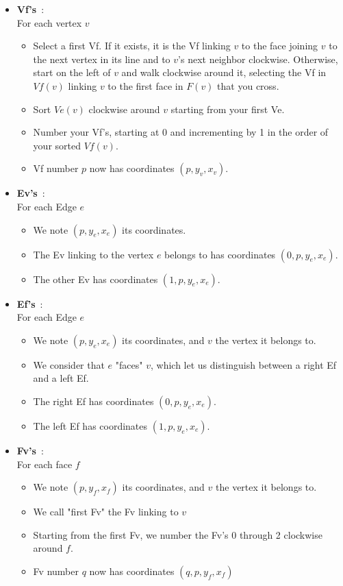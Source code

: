 \documentclass{article}
\begin{document}
\begin{itemize}
	\item \textbf{Vf's}~:\\
	For each vertex $v$
	\begin{itemize}[noitemsep, nosep, label=-]
		\item Select a first Vf. If it exists, it is the Vf linking $v$ to the face joining $v$ to the next vertex in its line and to $v$'s next neighbor clockwise. Otherwise, start on the left of $v$ and walk clockwise around it, selecting the Vf in $Vf(v)$ linking $v$ to the first face in $F(v)$ that you cross.
		\item Sort $Ve(v)$ clockwise around $v$ starting from your first Ve.
		\item Number your Vf's, starting at 0 and incrementing by 1 in the order of your sorted $Vf(v)$.
		\item Vf number $p$ now has coordinates $(p, y_v, x_v)$.
	\end{itemize}
	
	\item \textbf{Ev's}~:\\
	For each Edge $e$ 
	\begin{itemize}[noitemsep, nosep, label=-]
		\item We note $(p, y_e, x_e)$ its coordinates.
		\item The Ev linking to the vertex $e$ belongs to has coordinates $(0, p, y_e, x_e)$.
		\item The other Ev has coordinates $(1, p, y_e, x_e)$.
	\end{itemize}
	
	\item \textbf{Ef's}~:\\
	For each Edge $e$ 
	\begin{itemize}[noitemsep, nosep, label=-]
		\item We note $(p, y_e, x_e)$ its coordinates, and $v$ the vertex it belongs to.
		\item We consider that $e$ "faces" $v$, which let us distinguish between a right Ef and a left Ef.
		\item The right Ef has coordinates $(0, p, y_e, x_e)$.
		\item The left Ef has coordinates $(1, p, y_e, x_e)$.
	\end{itemize}
	
	\item \textbf{Fv's}~:\\
	For each face $f$ 
	\begin{itemize}[noitemsep, nosep, label=-]
		\item We note $(p, y_f, x_f)$ its coordinates, and $v$ the vertex it belongs to.
		\item We call "first Fv" the Fv linking to $v$
		\item Starting from the first Fv, we number the Fv's 0 through 2 clockwise around $f$.
		\item Fv number $q$ now has coordinates $(q, p, y_f, x_f)$
	\end{itemize}
	

\end{itemize}
\end{document}
